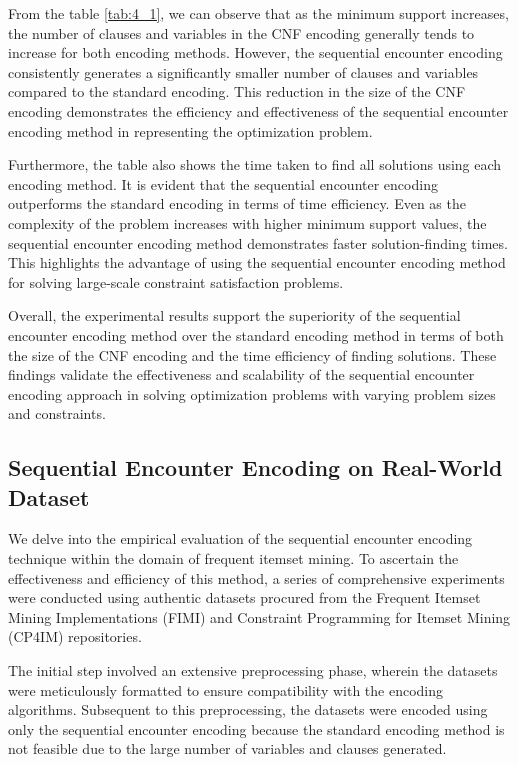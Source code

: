 From the table \ref{tab:4_1}, we can observe that as the minimum support increases,
the number of clauses and variables in the CNF encoding generally tends to increase for both encoding methods.
However, the sequential encounter encoding consistently generates a significantly smaller number of clauses and variables compared to the standard encoding.
This reduction in the size of the CNF encoding demonstrates the efficiency and effectiveness of the sequential encounter encoding method in representing the optimization problem.

Furthermore, the table also shows the time taken to find all solutions using each encoding method.
It is evident that the sequential encounter encoding outperforms the standard encoding in terms of time efficiency.
Even as the complexity of the problem increases with higher minimum support values, the sequential encounter encoding method demonstrates faster solution-finding times.
This highlights the advantage of using the sequential encounter encoding method for solving large-scale constraint satisfaction problems.

Overall, the experimental results support the superiority of the sequential encounter encoding method over the standard encoding method in terms of both the size of the CNF encoding and the time efficiency of finding solutions. These findings validate the effectiveness and scalability of the sequential encounter encoding approach in solving optimization problems with varying problem sizes and constraints.


\subsection{Sequential Encounter Encoding on Real-World Dataset}

We delve into the empirical evaluation of the sequential encounter encoding technique within the domain of frequent itemset mining. To ascertain the effectiveness and efficiency of this method, a series of comprehensive experiments were conducted using authentic datasets procured from the Frequent Itemset Mining Implementations (FIMI) and Constraint Programming\cite{constraint_programming} for Itemset Mining (CP4IM) repositories.

The initial step involved an extensive preprocessing phase,
wherein the datasets were meticulously formatted to ensure compatibility with
the encoding algorithms. Subsequent to this preprocessing,
the datasets were encoded using only the sequential encounter encoding because the standard encoding method is not feasible due to the large number of variables and clauses generated.

